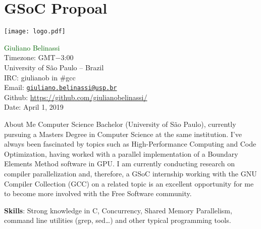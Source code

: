 \chapter{GSoC Propoal}
\label{ap:gsoc}


\begin{center}
\Huge \bf
\vspace{0.5cm}
\end{center}
\vspace*{\fill}
{
     \centering
     \texttt{[image: logo.pdf]}
    \par
}
\vspace*{\fill}
\normalsize{
\noindent\textcolor{darkgreen}{Giuliano Belinassi} \\
Timezone: GMT$-$3:00 \\
University of São Paulo -- Brazil \\
IRC: giulianob in \#gcc \\
Email: \href{mailto:giuliano.belinassi@usp.br}{\texttt{giuliano.belinassi@usp.br}} \\
Github: \url{https://github.com/giulianobelinassi/} \\
Date: April 1, 2019
}
\newpage

\begin{section}{About Me}
    Computer Science Bachelor (University of São Paulo), 
    currently pursuing a Masters Degree in Computer Science at the same
    institution. I've always been fascinated by topics such as
    High-Performance Computing and Code Optimization, having worked with
    a parallel implementation of a Boundary Elements Method software in GPU.
    I am currently conducting research on compiler parallelization and,
    therefore, a GSoC internship working with the GNU
    Compiler Collection (GCC) on a related topic is an excellent opportunity
    for me to become more involved with the Free Software community.

    \textbf{Skills}: Strong knowledge in C, Concurrency, Shared Memory Parallelism, command line utilities (grep, sed\dots) and other typical programming tools.
\end{section}

